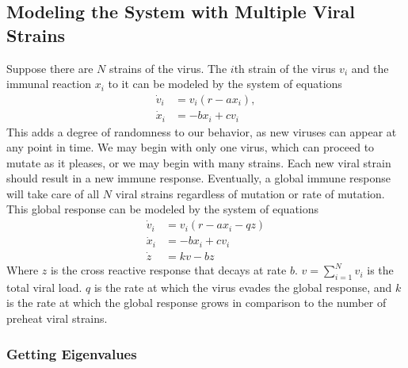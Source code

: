 \documentclass{article}
\begin{document}
\subsection{Modeling the System with Multiple Viral Strains}
Suppose there are $N$ strains of the virus.  The $i$th strain of the virus $v_i$ and the immunal reaction $x_i$ to it can be modeled by the system of equations
\begin{equation}
    \begin{split}
        \dot v_i &= v_i(r - ax_i), \\
        \dot x_i &= -bx_i + cv_i
    \end{split}
\end{equation}
This adds a degree of randomness to our behavior, as new viruses can appear at any point in time. We may begin with only one virus, which can proceed to mutate as it pleases, or we may begin with many strains. Each new viral strain should result in a new immune response. Eventually, a global immune response will take care of all $N$ viral strains regardless of mutation or rate of mutation. This global response can be modeled by the system of equations
\begin{equation}
    \begin{split}
        \dot v_i &= v_i(r - ax_i - qz) \\
        \dot x_i &= -bx_i + cv_i \\
        \dot z &= kv - bz
    \end{split}
\end{equation}
Where $z$ is the cross reactive response that decays at rate $b$.  $v = \sum^{N}_{i=1} v_i$ is the total viral load. $q$ is the rate at which the virus evades the global response, and $k$ is the rate at which the global response grows in comparison to the number of preheat viral strains.

\subsubsection{Getting Eigenvalues}
\end{document}
